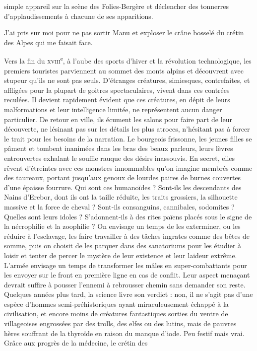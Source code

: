 simple appareil sur la scène des Folies-Bergère et déclencher des tonnerres d’applaudissements à chacune de ses apparitions.

J’ai pris sur moi pour ne pas sortir Manu et exploser le crâne bosselé du crétin des Alpes qui me faisait face.

\label{rat:48}%
Vers la fin du \textsc{xviii}\textsuperscript{e}, à l’aube des sports d’hiver et la révolution technologique, les premiers touristes parviennent au sommet des monts alpins et découvrent avec stupeur qu’ils ne sont pas seuls. D’étranges créatures, simiesques, contrefaites, et affligées pour la plupart de goitres spectaculaires, vivent dans ces contrées reculées. Il devient rapidement évident que ces créatures, en dépit de leurs malformations et leur intelligence limitée, ne représentent aucun danger particulier. De retour en ville, ils écument les salons pour faire part de leur découverte, ne lésinant pas sur les détails les plus atroces, n’hésitant pas à forcer le trait pour les besoins de la narration. Le bourgeois frissonne, les jeunes filles se pâment et tombent inanimées dans les bras des beaux parleurs, leurs lèvres entrouvertes exhalant le souffle rauque des désirs inassouvis. En secret, elles rêvent d’étreintes avec ces monstres innommables qu’on imagine membrés comme des taureaux, portant jusqu’aux genoux de lourdes paires de burnes couvertes d’une épaisse fourrure. Qui sont ces humanoïdes ? Sont-ils les descendants des Nains d’Erebor, dont ils ont la taille réduite, les traits grossiers, la silhouette massive et la force de cheval ? Sont-ils consanguins, cannibales, sodomites ? Quelles sont leurs idoles ? S’adonnent-ils à des rites païens placés sous le signe de la nécrophilie et la zoophilie ? On envisage un temps de les exterminer, ou les réduire à l’esclavage, les faire travailler à des tâches ingrates comme des bêtes de somme, puis on choisit de les parquer dans des sanatoriums pour les étudier à loisir et tenter de percer le mystère de leur existence et leur laideur extrême. L’armée envisage un temps de transformer les mâles en super-combattants pour les envoyer sur le front en première ligne en cas de conflit. Leur aspect menaçant devrait suffire à pousser l’ennemi à rebrousser chemin sans demander son reste. Quelques années plus tard, la science livre son verdict : non, il ne s’agit pas d’une espèce d’hommes semi-préhistoriques ayant miraculeusement échappé à la civilisation, et encore moins de créatures fantastiques sorties du ventre de villageoises engrossées par des trolls, des elfes ou des lutins, mais de pauvres hères souffrant de la thyroïde en raison du manque d’iode. Peu festif mais vrai. Grâce aux progrès de la médecine, le crétin des 